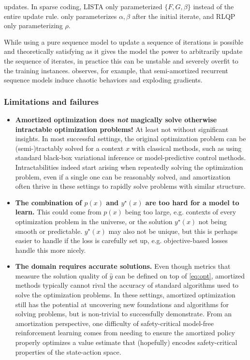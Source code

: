 \documentclass[twoside,11pt]{article}
\newcommand{\eg}{e.g.\xspace}
\begin{document}
\begin{itemize}
\begin{enumerate}
{    updates.} In sparse coding, LISTA \citep{gregor2010learning}
    only parameterized $\{F,G,\beta\}$ instead of the
    entire update rule.
    \citet{bai2022neural} only parameterizes $\alpha,\beta$
    after the initial iterate, and
    RLQP \citep{ichnowski2021accelerating} only parameterizing $\rho$.
  \end{enumerate}
  While using a pure sequence model to update a sequence of
  iterations is possible and theoretically satisfying as it
  gives the model the power to arbitrarily update the sequence
  of iterates, in practice this can be unstable and severely
  overfit to the training instances.
  \citet{metz2021gradients} observes, for example, that semi-amortized
  recurrent sequence models induce chaotic behaviors
  and exploding gradients.
\end{itemize}

\subsubsection{Limitations and failures}
\begin{itemize}
\item \textbf{Amortized optimization does \emph{not} magically solve otherwise
  intractable optimization problems!}
  At least not without significant insights.
  In most successful settings, the original optimization problem can be
  (semi-)tractably solved for a context $x$ with classical methods,
  such as using standard black-box variational inference
  or model-predictive control methods.
  Intractabilities indeed start arising when repeatedly solving
  the optimization problem, even if a single one can be reasonably solved,
  and amortization often thrive in these settings to rapidly solve
  problems with similar structure.
\item \textbf{The combination of $p(x)$ and $y^\star(x)$ are too hard
  for a model to learn.} This could come from $p(x)$ being too
  large, \eg contexts of every optimization problem in the universe,
  or the solution $y^\star(x)$ not being smooth or predictable.
  $y^\star(x)$ may also not be unique, but this is perhaps easier
  to handle if the loss is carefully set up, \eg objective-based
  losses handle this more nicely.
\item \textbf{The domain requires accurate solutions.}
  Even though metrics that measure the solution quality of $\hat y$
  can be defined on top of \cref{eq:opt}, amortized methods
  typically cannot rival the accuracy of standard algorithms
  used to solve the optimization problems.
  In these settings, amortized optimization still has the
  potential at uncovering new foundations and algorithms
  for solving problems, but is non-trivial to
  successfully demonstrate.
  From an amortization perspective, one difficulty of safety-critical
  model-free reinforcement learning comes from needing to
  ensure the amortized policy properly optimizes a
  value estimate that (hopefully) encodes safety-critical
  properties of the state-action space.
\end{itemize}
\end{document}
